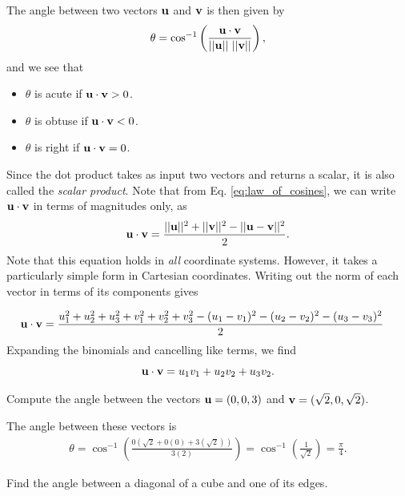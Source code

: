 \documentclass[12pt,letterpaper,reqno]{article}
\numberwithin{equation}{section}
\newcommand{\ti}[1]{\textit{#1}}
\begin{document}
The angle between two vectors ${\bf u}$ and ${\bf v}$ is then given by
\begin{equation}\label{eq:angle_uv}
	\theta=\cos^{-1}\left(\frac{{\bf u}\cdot {\bf v}}{||{\bf u}|| \ ||{\bf v}||}\right),
\end{equation}	
and we see that
\begin{itemize}
	\item $\theta$ is acute if ${\bf u} \cdot {\bf v} > 0$.
	\item $\theta$ is obtuse if ${\bf u} \cdot {\bf v} < 0$.
	\item $\theta$ is right if ${\bf u} \cdot {\bf v} = 0$.
\end{itemize}

Since the dot product takes as input two vectors and returns a scalar, it is also called the \ti{scalar product}. Note that from Eq. \eqref{eq:law_of_cosines}, we can write ${\bf u}\cdot {\bf v}$ in terms of magnitudes only, as 
\begin{equation}\label{eq:dot_product_magnitudes}
	{\bf u}\cdot {\bf v}=\frac{||{\bf u}||^2+||{\bf v}||^2-||{\bf u}-{\bf v}||^2}{2}.
\end{equation}
Note that this equation holds in \ti{all} coordinate systems. However, it takes a particularly simple form in Cartesian coordinates. Writing out the norm of each vector in terms of its components gives

\begin{align*}
	{\bf u}\cdot {\bf v}&=\frac{u_1^2+u_2^2+u_3^2+v_1^2+v_2^2+v_3^2-(u_1-v_1)^2-(u_2-v_2)^2-(u_3-v_3)^2}{2}
\end{align*}
Expanding the binomials and cancelling like terms, we find
\begin{equation}
	{\bf u}\cdot {\bf v}=u_1v_1+u_2v_2+u_3v_2.
\end{equation}

\begin{exercise}
Compute the angle between the vectors ${\bf u}=(0,0,3)$ and ${\bf v}=(\sqrt{2},0,\sqrt{2})$.	
\end{exercise}

{\color{red}  The angle between these vectors is
\begin{align*}
	\theta=\cos^{-1}\left(\frac{0(\sqrt{2}+0(0)+3(\sqrt{2}))}{3(2)}\right)=\cos^{-1}\left(\frac{1}{\sqrt{2}}\right)=\frac{\pi}{4}.
\end{align*}}

\begin{exercise}
	Find the angle between a diagonal of a cube and one of its edges.
\end{exercise}
\end{document}
